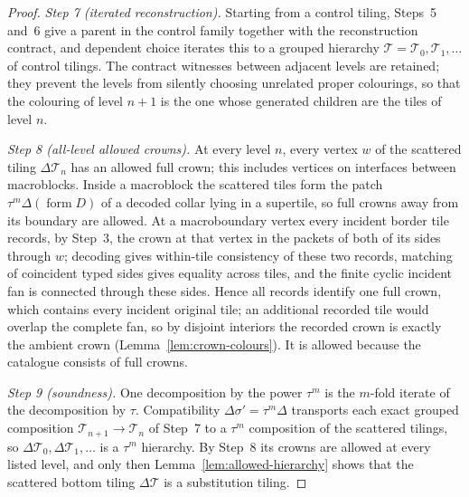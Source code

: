 \documentclass[11pt,a4paper]{article}
\theoremstyle{remark}
\begin{document}
\begin{proof}
\emph{Step 7 (iterated reconstruction).}  Starting from a control tiling,
Steps~5 and~6 give a parent in the control family together with the
reconstruction contract, and dependent choice iterates this to a grouped
hierarchy $\mathcal T=\mathcal T_0,\mathcal T_1,\ldots$ of control tilings.
The contract witnesses between adjacent levels are retained; they prevent
the levels from silently choosing unrelated proper colourings, so that the
colouring of level $n+1$ is the one whose generated children are the tiles
of level $n$.

\emph{Step 8 (all-level allowed crowns).}  At every level $n$, every vertex
$w$ of the scattered tiling $\Delta\mathcal T_n$ has an allowed full crown;
this includes vertices on interfaces between macroblocks.  Inside a
macroblock the scattered tiles form the patch $\tau^m\Delta(\operatorname
{form}D)$ of a decoded collar lying in a supertile, so full crowns away
from its boundary are allowed.  At a macroboundary vertex every incident
border tile records, by Step~3, the crown at that vertex in the packets of
both of its sides through $w$; decoding gives within-tile consistency of
these two records, matching of coincident typed sides gives equality across
tiles, and the finite cyclic incident fan is connected through these
sides.  Hence all records identify one full crown, which contains every
incident original tile; an additional recorded tile would overlap the
complete fan, so by disjoint interiors the recorded crown is exactly the
ambient crown (Lemma~\ref{lem:crown-colours}).  It is allowed because the
catalogue consists of full crowns.

\emph{Step 9 (soundness).}  One decomposition by the power $\tau^m$ is the
$m$-fold iterate of the decomposition by $\tau$.  Compatibility
$\Delta\sigma'=\tau^m\Delta$ transports each exact grouped composition
$\mathcal T_{n+1}\to\mathcal T_n$ of Step~7 to a $\tau^m$ composition of the
scattered tilings, so $\Delta\mathcal T_0,\Delta\mathcal T_1,\ldots$ is a
$\tau^m$ hierarchy.  By Step~8 its crowns are allowed at every listed level,
and only then Lemma~\ref{lem:allowed-hierarchy} shows that the scattered
bottom tiling $\Delta\mathcal T$ is a substitution tiling.


\end{proof}
\end{document}
